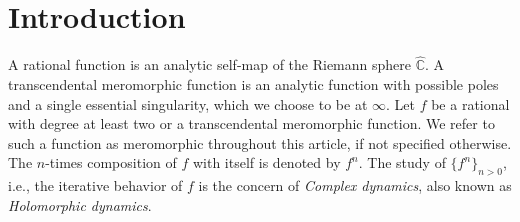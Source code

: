 \documentclass[12pt]{article}
\begin{document}
\section{Introduction}
A rational function is an analytic self-map of the Riemann sphere $\widehat{\mathbb{C}}$. A transcendental meromorphic function is an analytic function with possible poles and a single essential singularity, which we choose to be at $\infty$. Let $f$ be a rational with degree at least two or a  transcendental meromorphic function. We refer to such a function as meromorphic throughout this article, if not specified otherwise.  The $n$-times composition of $f$ with itself is denoted by $f^n$. The study of $\{f^n\}_{n>0}$, i.e., the iterative behavior of $f$ is the concern of \textit{Complex dynamics}, also known as \textit{Holomorphic dynamics}. 
\end{document}
